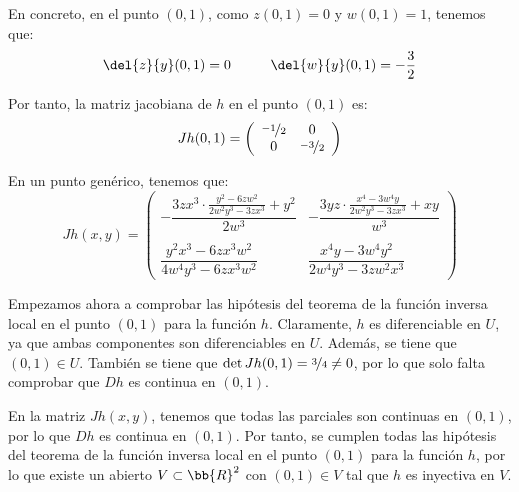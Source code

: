 \begin{ejercicio}
    En concreto, en el punto $(0,1)$, como $z(0,1)=0$ y $w(0,1)=1$, tenemos que:
    \begin{equation*}
        \del{z}{y}(0,1) = 0 \hspace{1cm}
        \del{w}{y}(0,1) = -\frac{3}{2}
    \end{equation*}

    Por tanto, la matriz jacobiana de $h$ en el punto $(0,1)$ es:
    \begin{equation*}
        Jh(0,1) = \left(
            \begin{array}{cc}
                \nicefrac{-1}{2} & 0 \\
                0 & \nicefrac{-3}{2}
            \end{array}
        \right)
    \end{equation*}

    En un punto genérico, tenemos que:
    \begin{equation*}
        Jh(x,y)=\left(
            \begin{array}{cc}
                -\dfrac{3zx^3\cdot \frac{y^2 - 6zw^2}{2w^2y^3 - 3zx^3} +y^2}{2w^3} & -\dfrac{3yz\cdot \frac{x^4 - 3w^4y}{2w^2y^3 - 3zx^3} +xy}{w^3} \\ \\
                \dfrac{y^2x^3 - 6zx^3w^2}{4w^4y^3 - 6zx^3w^2} & \dfrac{x^4y - 3w^4y^2}{2w^4y^3 - 3zw^2x^3}
            \end{array}
        \right)
    \end{equation*}

    Empezamos ahora a comprobar las hipótesis del teorema de la función inversa local en el punto $(0,1)$ para la función $h$.
    Claramente, $h$ es diferenciable en $U$, ya que ambas componentes son diferenciables en $U$.
    Además, se tiene que $(0,1)\in U$. También se tiene que $\det Jh(0,1) = \nicefrac{3}{4} \neq 0$, por
    lo que solo falta comprobar que $Dh$ es continua en $(0,1)$. 
    
    En la matriz $Jh(x,y)$, tenemos que todas las parciales son continuas en $(0,1)$, por lo que
    $Dh$ es continua en $(0,1)$. Por tanto, se cumplen todas las hipótesis del teorema de la función inversa local en el punto $(0,1)$ para la función $h$, por lo que
    existe un abierto $V\subset \bb{R}^2$ con $(0,1)\in V$ tal que $h$ es inyectiva en $V$.
\end{ejercicio}


